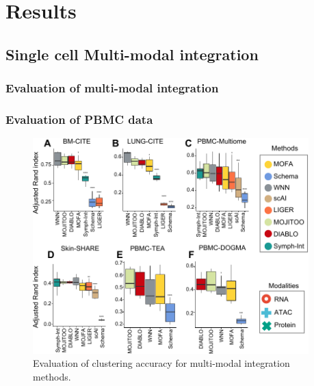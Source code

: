 \chapter{Results}
\label{chapter:results}

\graphicspath{{chapter5/figs}}


\section{Single cell Multi-modal integration}
\subsection{Evaluation of multi-modal integration}
\subsection{Evaluation of PBMC data}

\begin{figure}[!ht]
	\centering
	\includegraphics[width=0.95\textwidth]{ari/fig}
	\vspace{0.1cm}
	\caption[Evaluation of clustering accuracy for multi-modal integration methods.]{Evaluation of clustering accuracy for multi-modal integration methods.}
	\label{fig:ari}
\end{figure}


